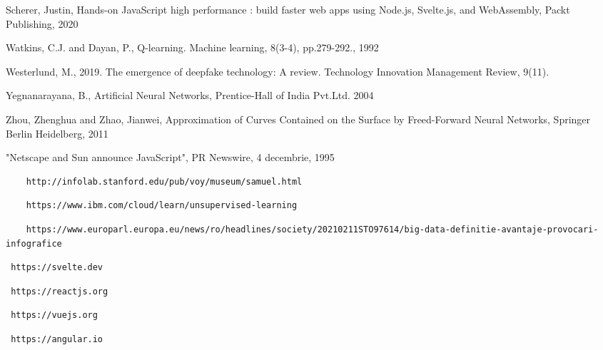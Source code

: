 \begin{thebibliography}{99}
 Scherer, Justin, Hands-on JavaScript high performance : build faster web apps using Node.js, Svelte.js, and WebAssembly, Packt Publishing, 2020

 Watkins, C.J. and Dayan, P., Q-learning. Machine learning, 8(3-4), pp.279-292., 1992 

 Westerlund, M., 2019. The emergence of deepfake technology: A review. Technology Innovation Management Review, 9(11).

 Yegnanarayana, B., Artificial Neural Networks, Prentice-Hall of India Pvt.Ltd. 2004

 Zhou, Zhenghua and Zhao, Jianwei, Approximation of Curves Contained on the Surface by Freed-Forward Neural Networks, Springer Berlin Heidelberg, 2011



 "Netscape and Sun announce JavaScript", PR Newswire, 4 decembrie, 1995

 \begin{verbatim}
	http://infolab.stanford.edu/pub/voy/museum/samuel.html
\end{verbatim}

 \begin{verbatim}
	https://www.ibm.com/cloud/learn/unsupervised-learning
\end{verbatim}

 \begin{verbatim}
	https://www.europarl.europa.eu/news/ro/headlines/society/20210211STO97614/big-data-definitie-avantaje-provocari-infografice
\end{verbatim}

 \begin{verbatim} https://svelte.dev 
\end{verbatim}

 \begin{verbatim} https://reactjs.org 
\end{verbatim}

 \begin{verbatim} https://vuejs.org 
\end{verbatim}

 \begin{verbatim} https://angular.io 
\end{verbatim}


\end{thebibliography}
